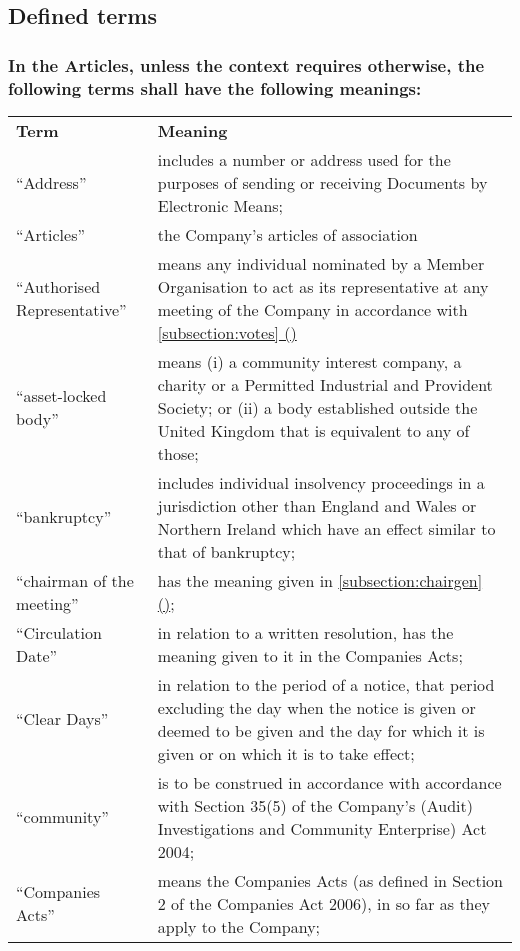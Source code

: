 \documentclass[12pt]{article}
\newcommand*{\fancyref}[1]{\hyperref[{#1}]{\autoref*{#1} (\nameref*{#1})}}
\begin{document}
\subsection*{Defined terms}
\subsubsection*{In the Articles, unless the context requires otherwise, the following terms shall have the following meanings:}

\begin{longtable}[p]{ p{1.5in} p{30em} }
{\bfseries{Term}} & {\bfseries{Meaning}} \\
  ``Address'' & includes a number or address used for the purposes of sending or receiving Documents by Electronic Means; \\
  ``Articles'' & the Company's articles of association \\
  ``Authorised Representative'' & means any individual nominated by a Member Organisation to act as its representative at any meeting of the Company in accordance with \fancyref{subsection:votes} \\
  ``asset-locked body'' & means (i) a community interest company, a charity  or a Permitted Industrial and Provident Society; or (ii) a body established outside the United Kingdom that is equivalent to any of those; \\
  ``bankruptcy'' & includes individual insolvency proceedings in a jurisdiction other than England and Wales or Northern Ireland which have an effect similar to that of bankruptcy; \\
  ``chairman of the meeting'' & has the meaning given in \fancyref{subsection:chairgen}; \\
  ``Circulation Date'' & in relation to a written resolution, has the meaning given to it in the Companies Acts; \\
  ``Clear Days'' & in relation to the period of a notice, that period excluding the day when the notice is given or deemed to be given and the day for which it is given or on which it is to take effect; \\
  ``community'' & is to be construed in accordance with accordance with Section 35(5) of the Company’s (Audit) Investigations and Community Enterprise) Act 2004; \\
  ``Companies Acts'' & means the Companies Acts (as defined in Section 2 of the Companies Act 2006), in so far as they apply to the Company; \\

\end{longtable}
\end{document}
